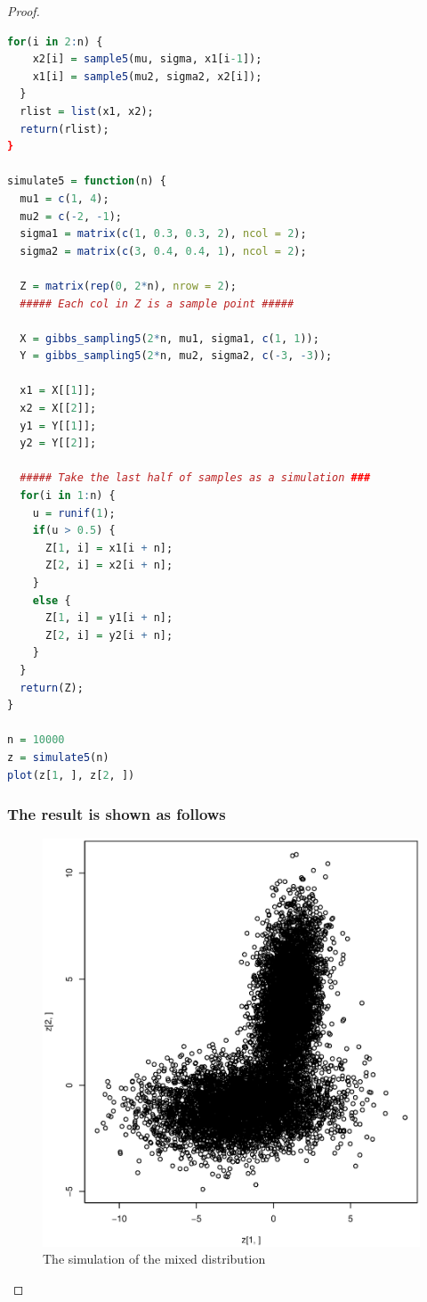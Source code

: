 \documentclass{article}
\begin{document}
\begin{proof}
\begin{lstlisting}[language = {R}]
  for(i in 2:n) {
    x2[i] = sample5(mu, sigma, x1[i-1]);
    x1[i] = sample5(mu2, sigma2, x2[i]);
  }
  rlist = list(x1, x2);
  return(rlist);
}

simulate5 = function(n) {
  mu1 = c(1, 4);
  mu2 = c(-2, -1);
  sigma1 = matrix(c(1, 0.3, 0.3, 2), ncol = 2);
  sigma2 = matrix(c(3, 0.4, 0.4, 1), ncol = 2);
  
  Z = matrix(rep(0, 2*n), nrow = 2);
  ##### Each col in Z is a sample point #####
  
  X = gibbs_sampling5(2*n, mu1, sigma1, c(1, 1));
  Y = gibbs_sampling5(2*n, mu2, sigma2, c(-3, -3));
  
  x1 = X[[1]];
  x2 = X[[2]];
  y1 = Y[[1]];
  y2 = Y[[2]];

  ##### Take the last half of samples as a simulation ###
  for(i in 1:n) {
    u = runif(1);
    if(u > 0.5) {
      Z[1, i] = x1[i + n];
      Z[2, i] = x2[i + n];
    }
    else {
      Z[1, i] = y1[i + n];
      Z[2, i] = y2[i + n];
    }
  }
  return(Z);
}

n = 10000
z = simulate5(n)
plot(z[1, ], z[2, ])
\end{lstlisting}
\subsubsection{The result is shown as follows}
\begin{figure}[htbp]
\centering
\includegraphics[width = 15cm]{Rplot.eps}
\caption{The simulation of the mixed distribution}
\label{mix}
\end{figure}
\end{proof}
\end{document}
